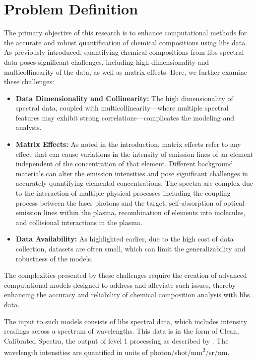 \section{Problem Definition}\label{sec:problem_definition}
The primary objective of this research is to enhance computational methods for the accurate and robust quantification of chemical compositions using \gls{libs} data.
As previously introduced, quantifying chemical compositions from \gls{libs} spectral data poses significant challenges, including high dimensionality and multicollinearity of the data, as well as matrix effects.
Here, we further examine these challenges:
\begin{itemize}
    \item \textbf{Data Dimensionality and Collinearity:} The high dimensionality of spectral data, coupled with multicollinearity—where multiple spectral features may exhibit strong correlations—complicates the modeling and analysis\cite{andersonImprovedAccuracyQuantitative2017}.
    \item \textbf{Matrix Effects:} As noted in the introduction, matrix effects refer to any effect that can cause variations in the intensity of emission lines of an element independent of the concentration of that element. Different background materials can alter the emission intensities and pose significant challenges in accurately quantifying elemental concentrations. The spectra are complex due to the interaction of multiple physical processes including the coupling process between the laser photons and the target, self-absorption of optical emission lines within the plasma, recombination of elements into molecules, and collisional interactions in the plasma\cite{cleggRecalibrationMarsScience2017, andersonImprovedAccuracyQuantitative2017}.
    \item \textbf{Data Availability:} As highlighted earlier, due to the high cost of data collection, datasets are often small, which can limit the generalizability and robustness of the models\cite{p9_paper}.
\end{itemize}

The complexities presented by these challenges require the creation of advanced computational models designed to address and alleviate such issues, thereby enhancing the accuracy and reliability of chemical composition analysis with \gls{libs} data.

The input to such models consists of \gls{libs} spectral data, which includes intensity readings across a spectrum of wavelengths.
This data is in the form of Clean, Calibrated Spectra\cite{andersonImprovedAccuracyQuantitative2017}, the output of level 1 processing as described by \citet{wiensPreflightCalibrationInitial2013}.
The wavelength intensities are quantified in units of photon/shot/mm\textsuperscript{2}/sr/nm.

